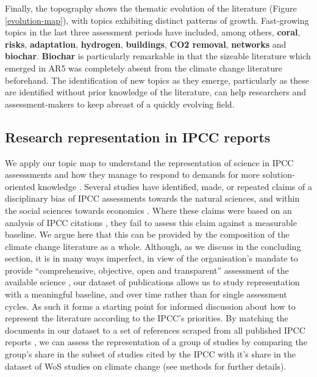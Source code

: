 \documentclass{article}
\begin{document}
\begin{linenumbers}
		Finally, the topography shows the thematic evolution of the literature (Figure \ref{evolution-map}), with topics exhibiting distinct patterns of growth. Fast-growing topics in the last three assessment periods have included, among others, \textbf{coral}, \textbf{risks}, \textbf{adaptation}, \textbf{hydrogen}, \textbf{buildings}, \textbf{CO2 removal}, \textbf{networks} and \textbf{biochar}. \textbf{Biochar} is particularly remarkable in that the sizeable literature which emerged in AR5 was completely absent from the climate change literature beforehand. 
		The identification of new topics as they emerge, particularly as these are identified without prior knowledge of the literature, can help researchers and assessment-makers to keep abreast of a quickly evolving field.
		
		
		\subsection*{Research representation in IPCC reports}
		We apply our topic map to understand the representation of science in IPCC assesssments and how they manage to respond to demands for more solution-oriented knowledge \cite{Kowarsch2017}.  Several studies have identified, made, or repeated claims of a disciplinary bias of IPCC assessments towards the natural sciences, and within the social sciences towards economics \cite{Bjurström2011, Victor2015, Hulme2010, Corbera2016}. Where these claims were based on an analysis of IPCC citations \cite{Bjurström2011}, they fail to assess this claim against a measurable baseline. We argue here that this can be provided by the composition of the climate change literature as a whole. Although, as we discuss in the concluding section, it is in many ways imperfect, in view of the organisation's mandate to provide ``comprehensive, objective, open and transparent'' assessment of the available science \cite{IPCC2013}, our dataset of publications allows us to study representation with a meaningful baseline, and over time rather than for single assessment cycles. As such it forms a starting point for informed discussion about how to represent the literature according to the IPCC's priorities.  By matching the documents in our dataset to a set of references scraped from all published IPCC reports \cite{Minx2017l}, we can assess the representation of a group of studies by comparing the group's share in the subset of studies cited by the IPCC with it's share in the dataset of WoS studies on climate change (see methods for further details). 
		

\end{linenumbers}
\end{document}
